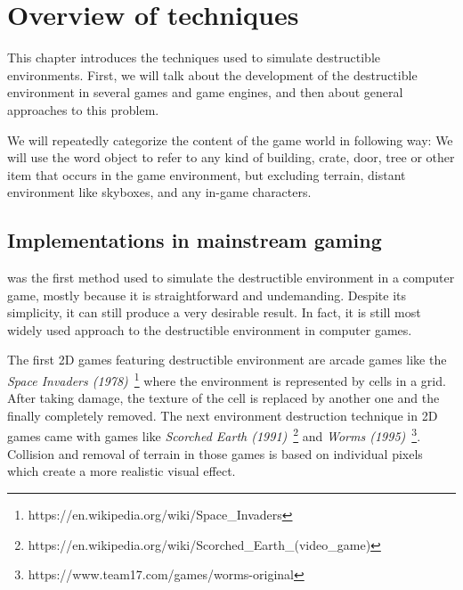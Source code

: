 \chapter{Overview of techniques}
This chapter introduces the techniques used to simulate destructible environments. First, we will talk about the development of the destructible environment in several games and game engines, and then about general approaches to this problem.

We will repeatedly categorize the content of the game world in following way: We will use the word object to refer to any kind of building, crate, door, tree or other item that occurs in the game environment, but excluding terrain, distant environment like skyboxes, and any in-game characters.


\section{Implementations in mainstream gaming} %


 was the first method used to simulate the destructible environment in a computer game, mostly because it is straightforward and undemanding. Despite its simplicity, it can still produce a very desirable result. In fact, it is still most widely used approach to the destructible environment in computer games.


The first 2D games featuring destructible environment are arcade games like the \emph{Space Invaders (1978)}~\footnote{https://en.wikipedia.org/wiki/Space\_Invaders} where the environment is represented by cells in a grid. After taking damage, the texture of the cell is replaced by another one and the finally completely removed. The next environment destruction technique in 2D games came with games like \emph{Scorched Earth (1991)}~\footnote{https://en.wikipedia.org/wiki/Scorched\_Earth\_(video\_game)} and \emph{Worms (1995)}~\footnote{https://www.team17.com/games/worms-original}. Collision and removal of terrain in those games is based on individual pixels which create a more realistic visual effect.

